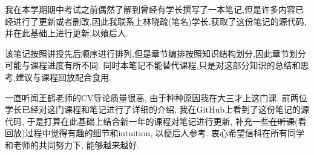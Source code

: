 我在本学期期中考试之前偶然了解到曾经有学长撰写了一本笔记,但是许多内容已经进行了更新或者删改,因此我联系上林晓疏(笔名)学长,获取了这份笔记的源代码,
并在此基础上进行更新,以飨后人.

该笔记按照讲授先后顺序进行排列,但是章节编排按照知识结构划分,因此章节划分可能与课程进度有所不同.
同时本笔记不能替代课程,只是对这部分知识的总结和思考,建议与课程回放配合食用.


一直听闻王鹤老师的CV导论质量很高, 由于种种原因我在大三才上这门课. 前两位学长已经对这门课程和笔记进行了详细的介绍, 
我在GitHub上看到了这份笔记的源代码, 于是打算在此基础上结合新一年的课程对笔记进行更新, 
补充一些\sout{在听课}(看回放)过程中觉得有趣的细节和intuition, 以便后人参考. 
衷心希望信科在所有同学和老师的共同努力下, 能够越来越好.

